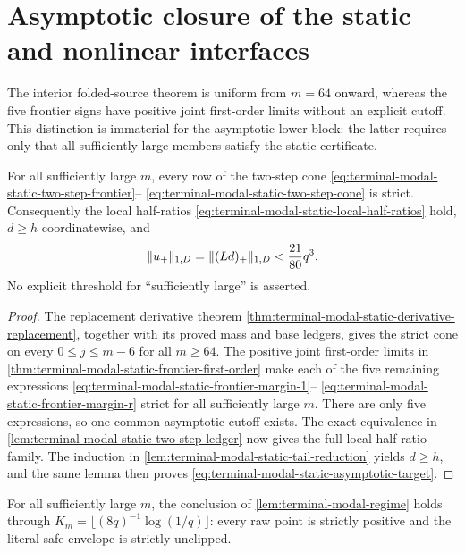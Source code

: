\section{Asymptotic closure of the static and nonlinear interfaces}
\label{sec:terminal-modal-asymptotic-closure}

The interior folded-source theorem is uniform from $m=64$ onward, whereas
the five frontier signs have positive joint first-order limits without an
explicit cutoff.  This distinction is immaterial for the asymptotic lower
block: the latter requires only that all sufficiently large members satisfy
the static certificate.

\begin{theorem}
\label{thm:terminal-modal-static-asymptotic-closure}
For all sufficiently large $m$, every row of the two-step cone
\eqref{eq:terminal-modal-static-two-step-frontier}--
\eqref{eq:terminal-modal-static-two-step-cone} is strict.  Consequently the
local half-ratios \eqref{eq:terminal-modal-static-local-half-ratios} hold,
$d\ge h$ coordinatewise, and
\begin{equation}
 \lVert u_+\rVert_{1,D}=\lVert(Ld)_+\rVert_{1,D}<\frac{21}{80}q^3.
 \label{eq:terminal-modal-static-asymptotic-target}
\end{equation}
No explicit threshold for ``sufficiently large'' is asserted.
\end{theorem}

\begin{proof}
The replacement derivative theorem
\cref{thm:terminal-modal-static-derivative-replacement}, together with its
proved mass and base ledgers, gives the strict cone on every
$0\le j\le m-6$ for all $m\ge64$.  The positive joint first-order limits in
\cref{thm:terminal-modal-static-frontier-first-order} make each of the five
remaining expressions
\eqref{eq:terminal-modal-static-frontier-margin-1}--
\eqref{eq:terminal-modal-static-frontier-margin-r} strict for all sufficiently
large $m$.  There are only five expressions, so one common asymptotic cutoff
exists.  The exact equivalence in
\cref{lem:terminal-modal-static-two-step-ledger} now gives the full local
half-ratio family.  The induction in
\cref{lem:terminal-modal-static-tail-reduction} yields $d\ge h$, and the
same lemma then proves \eqref{eq:terminal-modal-static-asymptotic-target}.
\end{proof}

\begin{theorem}
\label{thm:terminal-modal-regime-asymptotic}
For all sufficiently large $m$, the conclusion of
\cref{lem:terminal-modal-regime} holds through
$K_m=\lfloor(8q)^{-1}\log(1/q)\rfloor$: every raw point is strictly positive
and the literal safe envelope is strictly unclipped.
\end{theorem}


